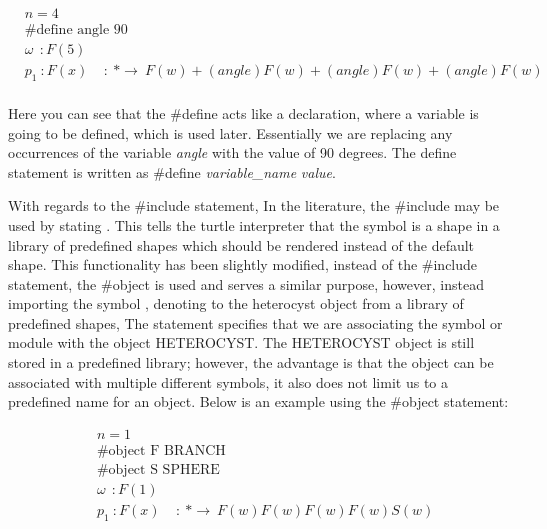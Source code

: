 \begin{singlespace}
\begin{equation} \label{define statement example}
\begin{aligned}
	&n=4 \\
	&\textrm{\#define angle 90}\\
	&\omega~~ : F(5)\\
	&p_1~ :  F(x)~~~~~ :~ * \rightarrow~ F(w)+(angle)F(w)+(angle)F(w)+(angle)F(w)\\
\end{aligned}
\end{equation}
\end{singlespace}
\vspace{5mm}
\noindent
Here you can see that the \#define acts like a declaration, where a variable is going to be defined, which is used later. Essentially we are replacing any occurrences of the variable \textit{angle} with the value of 90 degrees. The define statement is written as  \#define \textit{variable\_name} \textit{value}.

\newpage
\noindent
With regards to the \#include statement, In the literature, the \#include may be used by stating . This tells the turtle interpreter that the symbol  is a shape in a library of predefined shapes which should be rendered instead of the default shape. This functionality has been slightly modified, instead of the \#include statement, the \#object is used and serves a similar purpose, however, instead importing the symbol , denoting to the heterocyst object from a library of predefined shapes, The statement  specifies that we are associating the symbol or module  with the object HETEROCYST. The HETEROCYST object is still stored in a predefined library; however, the advantage is that the object can be associated with multiple different symbols, it also does not limit us to a predefined name for an object. Below is an example using the \#object statement: 

\begin{singlespace}
\begin{equation} \label{object statement example}
\begin{aligned}
	&n=1 \\
	&\textrm{\#object F BRANCH}\\
	&\textrm{\#object S SPHERE}\\
	&\omega~~ : F(1)\\
	&p_1~ :  F(x)~~~~~ :~ * \rightarrow~ F(w)F(w)F(w)F(w)S(w)\\
\end{aligned}
\end{equation}
\end{singlespace}

